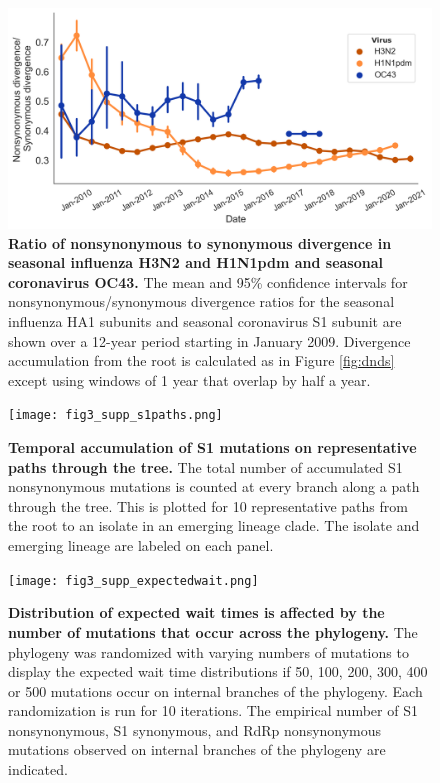 \documentclass[11pt,oneside,letterpaper]{article}
\begin{document}
\begin{figure}[h!]
\centerline{\includegraphics[scale=0.55]{fig2_supp_seasonalflu.png}}
\caption{\textbf{Ratio of nonsynonymous to synonymous divergence in seasonal influenza H3N2 and H1N1pdm and seasonal coronavirus OC43.}
The mean and 95\% confidence intervals for nonsynonymous/synonymous divergence ratios for the seasonal influenza HA1 subunits and seasonal coronavirus S1 subunit are shown over a 12-year period starting in January 2009. Divergence accumulation from the root is calculated as in Figure \ref{fig:dnds} except using windows of 1 year that overlap by half a year. 
}
\label{fig:seasonaldnds}
\end{figure}

\begin{figure}[h!]
\centerline{\texttt{[image: fig3\_supp\_s1paths.png]}}
\caption{\textbf{Temporal accumulation of S1 mutations on representative paths through the tree.}
The total number of accumulated S1 nonsynonymous mutations is counted at every branch along a path through the tree. This is plotted for 10 representative paths from the root to an isolate in an emerging lineage clade. The isolate and emerging lineage are labeled on each panel.
}
\label{fig:s1paths}
\end{figure}

\begin{figure}[h!]
\centerline{\texttt{[image: fig3\_supp\_expectedwait.png]}}
\caption{\textbf{Distribution of expected wait times is affected by the number of mutations that occur across the phylogeny.}
The phylogeny was randomized with varying numbers of mutations to display the expected wait time distributions if 50, 100, 200, 300, 400 or 500 mutations occur on internal branches of the phylogeny. Each randomization is run for 10 iterations. The empirical number of S1 nonsynonymous, S1 synonymous, and RdRp nonsynonymous mutations observed on internal branches of the phylogeny are indicated.
}
\label{fig:expectedwait}
\end{figure}
\end{document}
